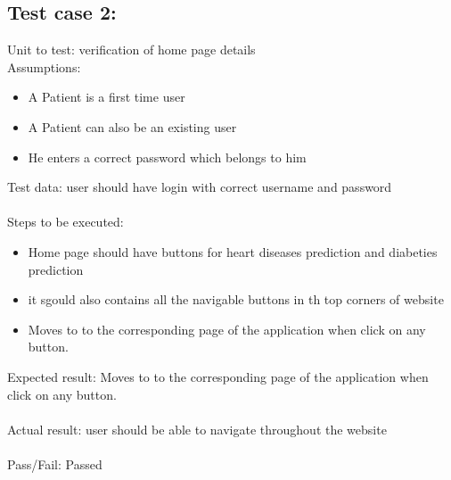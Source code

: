 \documentclass[oneside,12pt]{Classes/VTU}
\begin{document}
	\subsection{Test case 2:}
	Unit to test: verification of home page details\\
	Assumptions:\\
	\begin{itemize}
		\item A Patient is a first time user
		\item A Patient can also be an existing user
		\item He enters a correct password which belongs to him
	\end{itemize}
	Test data: user should have login with correct username and password\\
	\\
	Steps to be executed:\\
	\begin{itemize}
		\item Home page should have buttons for heart diseases prediction and diabeties prediction
		\item it sgould also contains all the navigable buttons in th top corners of website
		\item Moves to to the corresponding page of the application when click on any button.
	\end{itemize}
	Expected result:  Moves to to the corresponding page of the application when click on any button.\\
	\\
	Actual result: user should be able to navigate throughout the website\\
	\\
	Pass/Fail: Passed\\
	\\
	
\end{document}
